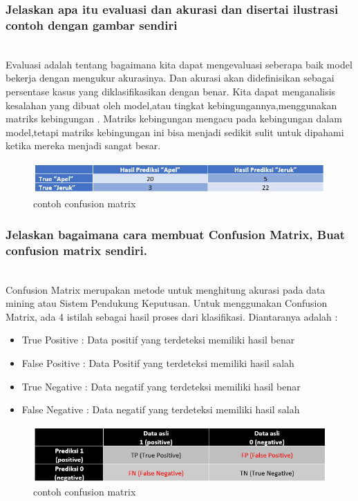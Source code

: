 \subsubsection{Jelaskan apa itu evaluasi dan akurasi dan disertai ilustrasi contoh dengan gambar sendiri}
\hfill\\
Evaluasi adalah tentang bagaimana kita dapat mengevaluasi seberapa baik model bekerja dengan mengukur akurasinya. Dan akurasi akan dideﬁnisikan sebagai persentase kasus yang diklasiﬁkasikan dengan benar. Kita dapat menganalisis kesalahan yang dibuat oleh model,atau tingkat kebingungannya,menggunakan matriks kebingungan . Matriks kebingungan mengacu pada kebingungan dalam model,tetapi matriks kebingungan ini bisa menjadi sedikit sulit untuk dipahami ketika mereka menjadi sangat besar.
\begin{figure}[H]
    \includegraphics[width=12cm]{figures/1174083/figures2/5.png}
    \centering
    \caption{contoh confusion matrix}
\end{figure}

\subsubsection{Jelaskan bagaimana cara membuat Confusion Matrix, Buat confusion matrix sendiri.}
\hfill\\
Confusion Matrix merupakan metode untuk menghitung akurasi pada data mining atau Sistem Pendukung Keputusan. Untuk menggunakan Confusion Matrix, ada 4 istilah sebagai hasil proses dari klasifikasi. Diantaranya adalah :
\begin{itemize}
    \item True Positive : Data positif yang terdeteksi memiliki hasil benar
    \item False Positive : Data Positif yang terdeteksi memiliki hasil salah
    \item True Negative : Data negatif yang terdeteksi memiliki hasil benar
    \item False Negative : Data negatif yang terdeteksi memiliki hasil salah
\end{itemize}
\begin{figure}[H]
    \includegraphics[width=12cm]{figures/1174083/figures2/6.png}
    \centering
    \caption{contoh confusion matrix}
\end{figure}	

